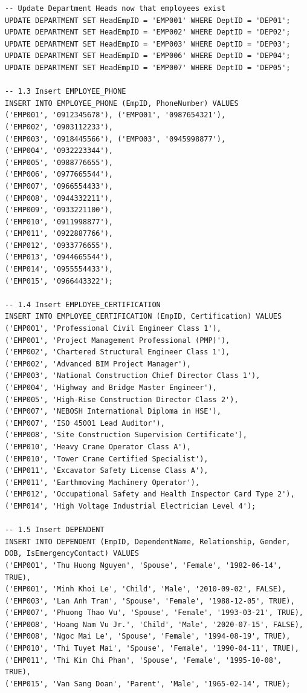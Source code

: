 \documentclass[a4paper,12pt]{report}
\begin{document}
\begin{lstlisting}
-- Update Department Heads now that employees exist
UPDATE DEPARTMENT SET HeadEmpID = 'EMP001' WHERE DeptID = 'DEP01';
UPDATE DEPARTMENT SET HeadEmpID = 'EMP002' WHERE DeptID = 'DEP02';
UPDATE DEPARTMENT SET HeadEmpID = 'EMP003' WHERE DeptID = 'DEP03';
UPDATE DEPARTMENT SET HeadEmpID = 'EMP006' WHERE DeptID = 'DEP04';
UPDATE DEPARTMENT SET HeadEmpID = 'EMP007' WHERE DeptID = 'DEP05';

-- 1.3 Insert EMPLOYEE_PHONE
INSERT INTO EMPLOYEE_PHONE (EmpID, PhoneNumber) VALUES
('EMP001', '0912345678'), ('EMP001', '0987654321'),
('EMP002', '0903112233'),
('EMP003', '0918445566'), ('EMP003', '0945998877'),
('EMP004', '0932223344'),
('EMP005', '0988776655'),
('EMP006', '0977665544'),
('EMP007', '0966554433'),
('EMP008', '0944332211'),
('EMP009', '0933221100'),
('EMP010', '0911998877'),
('EMP011', '0922887766'),
('EMP012', '0933776655'),
('EMP013', '0944665544'),
('EMP014', '0955554433'),
('EMP015', '0966443322');

-- 1.4 Insert EMPLOYEE_CERTIFICATION
INSERT INTO EMPLOYEE_CERTIFICATION (EmpID, Certification) VALUES
('EMP001', 'Professional Civil Engineer Class 1'),
('EMP001', 'Project Management Professional (PMP)'),
('EMP002', 'Chartered Structural Engineer Class 1'),
('EMP002', 'Advanced BIM Project Manager'),
('EMP003', 'National Construction Chief Director Class 1'),
('EMP004', 'Highway and Bridge Master Engineer'),
('EMP005', 'High-Rise Construction Director Class 2'),
('EMP007', 'NEBOSH International Diploma in HSE'),
('EMP007', 'ISO 45001 Lead Auditor'),
('EMP008', 'Site Construction Supervision Certificate'),
('EMP010', 'Heavy Crane Operator Class A'),
('EMP010', 'Tower Crane Certified Specialist'),
('EMP011', 'Excavator Safety License Class A'),
('EMP011', 'Earthmoving Machinery Operator'),
('EMP012', 'Occupational Safety and Health Inspector Card Type 2'),
('EMP014', 'High Voltage Industrial Electrician Level 4');

-- 1.5 Insert DEPENDENT
INSERT INTO DEPENDENT (EmpID, DependentName, Relationship, Gender, DOB, IsEmergencyContact) VALUES
('EMP001', 'Thu Huong Nguyen', 'Spouse', 'Female', '1982-06-14', TRUE),
('EMP001', 'Minh Khoi Le', 'Child', 'Male', '2010-09-02', FALSE),
('EMP003', 'Lan Anh Tran', 'Spouse', 'Female', '1988-12-05', TRUE),
('EMP007', 'Phuong Thao Vu', 'Spouse', 'Female', '1993-03-21', TRUE),
('EMP008', 'Hoang Nam Vu Jr.', 'Child', 'Male', '2020-07-15', FALSE),
('EMP008', 'Ngoc Mai Le', 'Spouse', 'Female', '1994-08-19', TRUE),
('EMP010', 'Thi Tuyet Mai', 'Spouse', 'Female', '1990-04-11', TRUE),
('EMP011', 'Thi Kim Chi Phan', 'Spouse', 'Female', '1995-10-08', TRUE),
('EMP015', 'Van Sang Doan', 'Parent', 'Male', '1965-02-14', TRUE);


\end{lstlisting}
\end{document}
